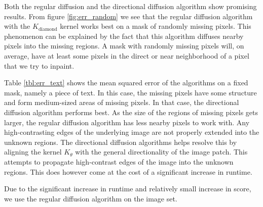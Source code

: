 Both the regular diffusion and the directional diffusion algorithm show promising results. From figure \ref{fig:err_random} we see that the regular diffusion algorithm with the $K_{\text{diamond}}$ kernel works best on a mask of randomly missing pixels. This phenomenon can be explained by the fact that this algorithm diffuses nearby pixels into the missing regions. A mask with randomly missing pixels will, on average, have at least some pixels in the direct or near neighborhood of a pixel that we try to inpaint.


Table \ref{tbl:err_text} shows the mean squared error of the algorithms on a fixed mask, namely a piece of text. In this case, the missing pixels have some structure and form medium-sized areas of missing pixels. In that case, the directional diffusion algorithm performs best. As the size of the regions of missing pixels gets larger, the regular diffusion algorithm has less nearby pixels to work with. Any high-contrasting edges of the underlying image are not properly extended into the unknown regions. The directional diffusion algorithms helps resolve this by aligning the kernel  $K_{\theta}$ with the general directionality of the image patch. This attempts to propagate high-contrast edges of the image into the unknown regions. This does however come at the cost of a significant increase in runtime.

Due to the significant increase in runtime and relatively small increase in score, we use the regular diffusion algorithm on the image set.